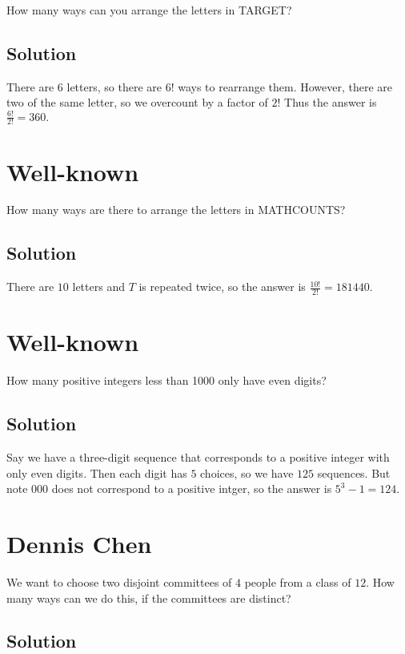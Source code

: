 \documentclass[blue,onecol]{shooting}
\begin{document}
How many ways can you arrange the letters in TARGET?

\subsection{Solution}

There are $6$ letters, so there are $6!$ ways to rearrange them. However, there are two of the same letter, so we overcount by a factor of $2!$ Thus the answer is $\frac{6!}{2!}=360.$

\section{Well-known}

How many ways are there to arrange the letters in MATHCOUNTS?

\subsection{Solution}
There are $10$ letters and $T$ is repeated twice, so the answer is $\frac{10!}{2!}=181440.$

\section{Well-known}

How many positive integers less than 1000 only have even digits?

\subsection{Solution}

Say we have a three-digit sequence that corresponds to a positive integer with only even digits. Then each digit has $5$ choices, so we have $125$ sequences. But note $000$ does not correspond to a positive intger, so the answer is $5^3 - 1 = 124.$

\section{Dennis Chen}

We want to choose two disjoint committees of $4$ people from a class of $12.$ How many ways can we do this, if the committees are distinct?
\subsection{Solution}
\end{document}
